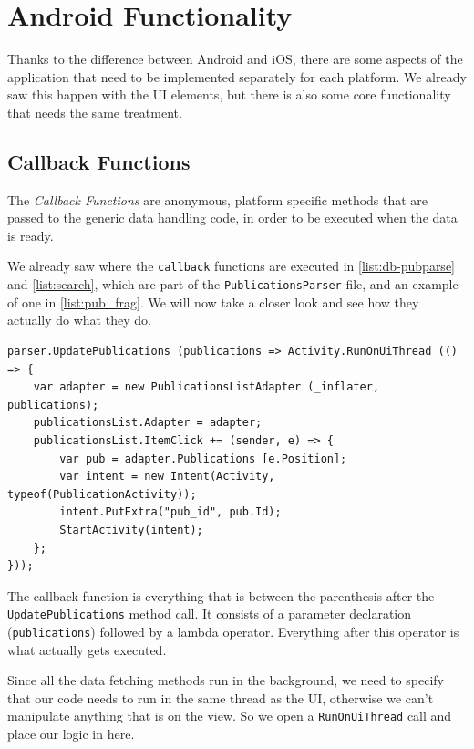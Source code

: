 \section{Android Functionality}

Thanks to the difference between Android and iOS, there are some aspects of the application that need to be implemented separately for each platform. We already saw this happen with the \ac{UI} elements, but there is also some core functionality that needs the same treatment.

\subsection{Callback Functions}\label{callback:and}

The \textit{Callback Functions} are anonymous, platform specific methods that are passed to the generic data handling code, in order to be executed when the data is ready.

We already saw where the \texttt{callback} functions are executed in \autoref{list:db-pubparse} and \autoref{list:search}, which are part of the \texttt{PublicationsParser} file, and an example of one in \autoref{list:pub_frag}. We will now take a closer look and see how they actually do what they do.

\begin{lstlisting}[frame=lt,caption=Callback, label={list:call_and}]
parser.UpdatePublications (publications => Activity.RunOnUiThread (() => {
	var adapter = new PublicationsListAdapter (_inflater, publications);
	publicationsList.Adapter = adapter;
	publicationsList.ItemClick += (sender, e) => {
		var pub = adapter.Publications [e.Position];
		var intent = new Intent(Activity, typeof(PublicationActivity));
		intent.PutExtra("pub_id", pub.Id);
		StartActivity(intent);
	};
}));
\end{lstlisting}

The callback function is everything that is between the parenthesis after the \texttt{UpdatePublications} method call. It consists of a parameter declaration (\texttt{publications}) followed by a lambda operator. Everything after this operator is what actually gets executed. 

Since all the data fetching methods run in the background, we need to specify that our code needs to run in the same thread as the \ac{UI}, otherwise we can't manipulate anything that is on the view. So we open a \texttt{RunOnUiThread} call and place our logic in here.

